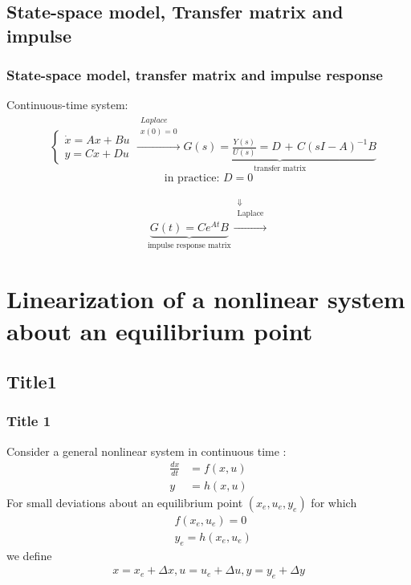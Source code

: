 \subsection{State-space model, Transfer matrix and impulse}
\begin{frame}
\frametitle{State-space model, transfer matrix and impulse
response}

Continuous-time system: 
\vspace{0.1cm}
\begin{align*}
		& \begin{cases}
			\dot{x} = Ax + Bu\\
			y = Cx + Du
		\end{cases} \xrightarrow{
		    \begin{array}{c}
                Laplace\\
                x(0)=0\\
            \end{array}
            }
		\underbrace{G(s)=\frac{Y(s)}{U(s)}=D\text{ + }C({sI-A})^{-1}B}_{\text{transfer matrix}}
	\end{align*}
$$\text{in practice: }D=0$$


\begin{align*}
\underbrace{G(t)=Ce^{At}B}_{\text{impulse response     matrix}} \xrightarrow{
		    \begin{array}{c}
               \Downarrow\\
             \text{Laplace}\\
         \end{array}} 
\end{align*}



\end{frame}

\section{Linearization of a nonlinear system
about an equilibrium point}
\subsection{Title1}
\begin{frame}
	\frametitle{Title 1}
	
Consider a general nonlinear system in continuous time :
\begin{align*}
\frac{dx}{dt}&= f(x, u)\\
y&=h(x,u)
\end{align*}
For small deviations about an equilibrium point $(x_e, u_e, y_e)$ for which
\begin{align*}
&f(x_e,u_e)= 0\\
&y_e=h(x_e,u_e)
\end{align*}
we define
\begin{align*}
x = x_e + \Delta x, u = u_e + \Delta u, y = y_e + \Delta y
\end{align*}
\end{frame}

